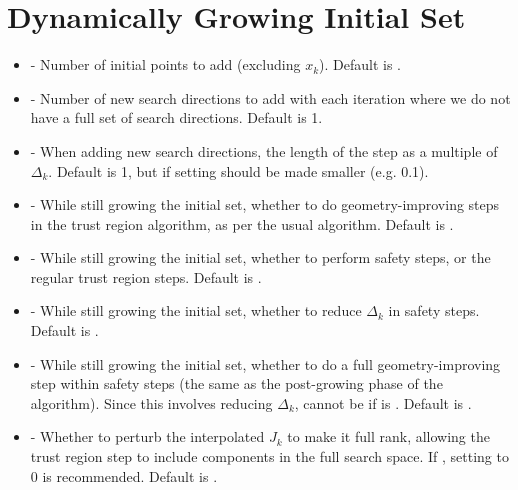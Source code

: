 \documentclass[letterpaper,10pt,english]{sphinxmanual}
\begin{document}
\section{Dynamically Growing Initial Set}
\label{\detokenize{advanced:dynamically-growing-initial-set}}\begin{itemize}
\item {} 
 - Number of initial points to add (excluding \(x_k\)). Default is .

\item {} 
 - Number of new search directions to add with each iteration where we do not have a full set of search directions. Default is 1.

\item {} 
 - When adding new search directions, the length of the step as a multiple of \(\Delta_k\). Default is 1, but if setting  should be made smaller (e.g. 0.1).

\item {} 
 - While still growing the initial set, whether to do geometry-improving steps in the trust region algorithm, as per the usual algorithm. Default is .

\item {} 
 - While still growing the initial set, whether to perform safety steps, or the regular trust region steps. Default is .

\item {} 
 - While still growing the initial set, whether to reduce \(\Delta_k\) in safety steps. Default is .

\item {} 
 - While still growing the initial set, whether to do a full geometry-improving step within safety steps (the same as the post-growing phase of the algorithm). Since this involves reducing \(\Delta_k\), cannot be  if  is . Default is .

\item {} 
 - Whether to perturb the interpolated \(J_k\) to make it full rank, allowing the trust region step to include components in the full search space. If , setting  to 0 is recommended. Default is .


\end{itemize}
\end{document}
